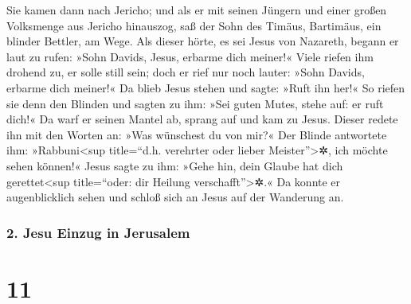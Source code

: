  Sie kamen dann nach Jericho; und als er mit seinen
Jüngern und einer großen Volksmenge aus Jericho hinauszog, saß der Sohn
des Timäus, Bartimäus, ein blinder Bettler, am Wege.  Als
dieser hörte, es sei Jesus von Nazareth, begann er laut zu rufen: »Sohn
Davids, Jesus, erbarme dich meiner!«  Viele riefen ihm
drohend zu, er solle still sein; doch er rief nur noch lauter: »Sohn
Davids, erbarme dich meiner!«  Da blieb Jesus stehen und
sagte: »Ruft ihn her!« So riefen sie denn den Blinden und sagten zu ihm:
»Sei guten Mutes, stehe auf: er ruft dich!«  Da warf er
seinen Mantel ab, sprang auf und kam zu Jesus.  Dieser
redete ihn mit den Worten an: »Was wünschest du von mir?« Der Blinde
antwortete ihm: »Rabbuni\textless sup title=``d.h. verehrter oder lieber
Meister''\textgreater✲, ich möchte sehen können!«  Jesus
sagte zu ihm: »Gehe hin, dein Glaube hat dich gerettet\textless sup
title=``oder: dir Heilung verschafft''\textgreater✲.« Da konnte er
augenblicklich sehen und schloß sich an Jesus auf der Wanderung an.

\hypertarget{jesu-einzug-in-jerusalem}{%
\subsubsection{2. Jesu Einzug in
Jerusalem}\label{jesu-einzug-in-jerusalem}}

\hypertarget{section-10}{%
\section{11}\label{section-10}}

